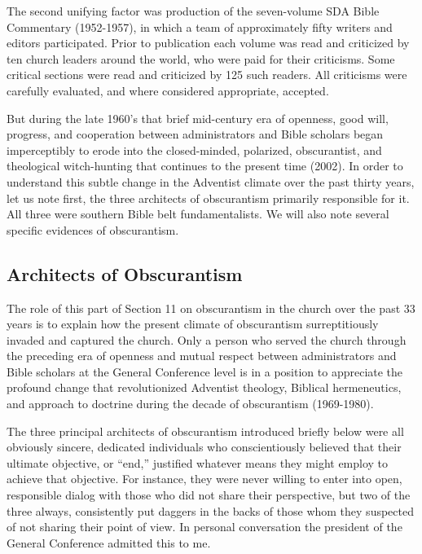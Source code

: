 The second unifying factor was production of the seven-volume SDA Bible
Commentary (1952-1957), in which a team of approximately 
fifty writers and editors participated. Prior to 
publication each volume was read and
criticized by ten church leaders around the world, who were paid for their
criticisms. Some 
critical sections were read and criticized by 125 such
readers. All criticisms were carefully evaluated, and where considered
appropriate, accepted.

But during the late 1960's that brief mid-century era of openness, good
will, progress, and cooperation between administrators and Bible scholars
began imperceptibly to erode into the closed-minded, polarized,
obscurantist, and theological witch-hunting that continues to the present
time (2002). In order to understand this subtle change in the Adventist
climate over the past thirty years, let us note first, the three architects
of obscurantism primarily responsible for it. All three were southern Bible
belt fundamentalists. We will also note several specific evidences of
obscurantism.

\subsection{Architects of Obscurantism}

The role of this part of Section 11 on obscurantism in the church over the
past 33 years is to explain how the present climate of obscurantism
surreptitiously invaded and captured the church. Only a person who served
the church through the preceding era of openness and mutual respect between
administrators and Bible scholars at the General Conference level is in a
position to appreciate the profound change that revolutionized Adventist
theology, Biblical hermeneutics, and approach to doctrine during the decade
of obscurantism (1969-1980).

The three principal architects of obscurantism introduced briefly below were
all obviously sincere, dedicated individuals who conscientiously believed
that their ultimate objective, or ``end,'' justified whatever means they might
employ to achieve that objective. For instance, they were never willing to
enter into open, responsible dialog with those who did not share their
perspective, but two of the three always, consistently put daggers in the
backs of those whom they suspected of not sharing their point of view. In
personal conversation the president of the General Conference admitted this
to me.

